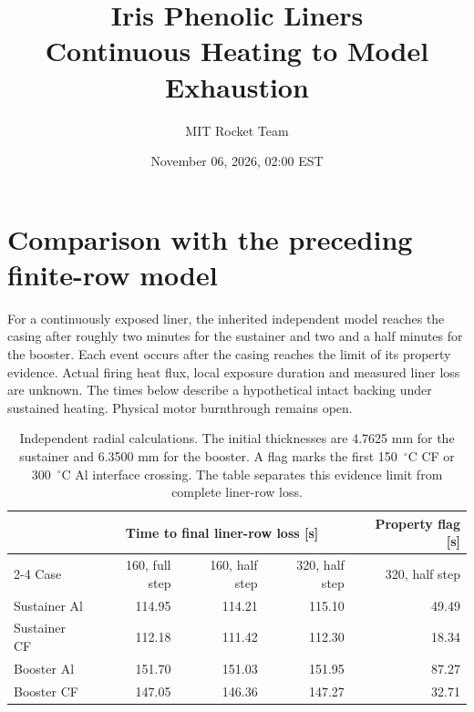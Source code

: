 \documentclass[11pt]{article}
\title{Iris Phenolic Liners\\Continuous Heating to Model Exhaustion}
\author{MIT Rocket Team}
\date{November 06, 2026, 02:00 EST}
\begin{document}
\maketitle















\section{Comparison with the preceding finite-row model}
For a continuously exposed liner, the inherited independent model reaches
the casing after roughly two minutes for the sustainer and two and a half
minutes for the booster. Each event occurs after the casing reaches the limit
of its property evidence. Actual firing heat flux, local exposure duration
and measured liner loss are unknown. The times below describe a hypothetical
intact backing under sustained heating. Physical motor burnthrough remains open.

\begin{table}[H]\centering
\begin{tabular}{lrrrr}\toprule
 & \multicolumn{3}{c}{Time to final liner-row loss [s]} & Property flag [s]\\
\cmidrule(lr){2-4}
Case & 160, full step & 160, half step & 320, half step & 320, half step\\\midrule
Sustainer Al & 114.95 & 114.21 & 115.10 & 49.49 \\
Sustainer CF & 112.18 & 111.42 & 112.30 & 18.34 \\
Booster Al & 151.70 & 151.03 & 151.95 & 87.27 \\
Booster CF & 147.05 & 146.36 & 147.27 & 32.71 \\
\bottomrule\end{tabular}
\caption{Independent radial calculations. The initial thicknesses are 4.7625 mm
for the sustainer and 6.3500 mm for the booster. A flag marks the first
150~$^\circ$C CF or 300~$^\circ$C Al interface crossing. The table separates
this evidence limit from complete liner-row loss.}
\end{table}
\end{document}

